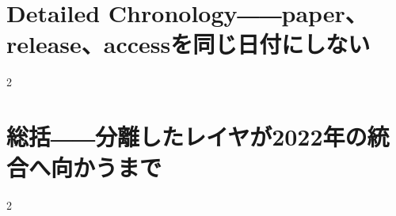 \documentclass[lualatex,a4paper,11pt]{jlreq}
\begin{document}
\Needspace{0.45\textheight}
\bigskip
\section{Detailed Chronology――paper、release、accessを同じ日付にしない}
\label{pkg:annual-chronology}

\medskip
\begin{multicols}{2}

\end{multicols}

\Needspace{0.45\textheight}
\bigskip
\section{総括――分離したレイヤが2022年の統合へ向かうまで}
\label{pkg:synthesis-transition-2022}

\medskip
\begin{multicols}{2}

\end{multicols}


\Needspace{0.30\textheight}
\bigskip
{}\par
\smallskip
\printbibliography[title={References / Source Notes}]
\end{document}
